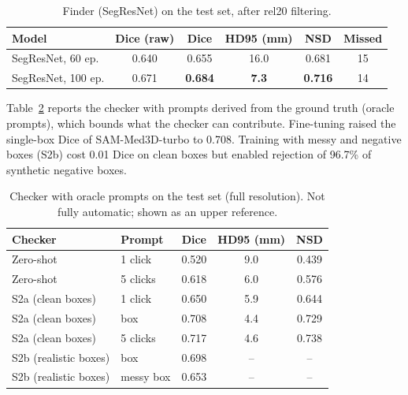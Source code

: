 \documentclass[journal]{IEEEtran}
\begin{document}
\begin{table}[t]
\centering
\caption{Finder (SegResNet) on the test set, after rel20 filtering.}
\label{tab:finder}
\setlength{\tabcolsep}{4pt}
\begin{tabular}{lccccc}
\toprule
Model & Dice (raw) & Dice & HD95 (mm) & NSD & Missed \\
\midrule
SegResNet, 60 ep. & 0.640 & 0.655 & 16.0 & 0.681 & 15 \\
SegResNet, 100 ep. & 0.671 & \textbf{0.684} & \textbf{7.3} & \textbf{0.716} & 14 \\
\bottomrule
\end{tabular}
\end{table}

Table~\ref{tab:checker} reports the checker with prompts derived from the ground truth (oracle prompts), which bounds what the checker can contribute. Fine-tuning raised the single-box Dice of SAM-Med3D-turbo to 0.708. Training with messy and negative boxes (S2b) cost 0.01 Dice on clean boxes but enabled rejection of 96.7\% of synthetic negative boxes.

\begin{table}[t]
\centering
\caption{Checker with oracle prompts on the test set (full resolution). Not fully automatic; shown as an upper reference.}
\label{tab:checker}
\setlength{\tabcolsep}{4pt}
\begin{tabular}{llccc}
\toprule
Checker & Prompt & Dice & HD95 (mm) & NSD \\
\midrule
Zero-shot & 1 click & 0.520 & 9.0 & 0.439 \\
Zero-shot & 5 clicks & 0.618 & 6.0 & 0.576 \\
S2a (clean boxes) & 1 click & 0.650 & 5.9 & 0.644 \\
S2a (clean boxes) & box & 0.708 & 4.4 & 0.729 \\
S2a (clean boxes) & 5 clicks & 0.717 & 4.6 & 0.738 \\
S2b (realistic boxes) & box & 0.698 & -- & -- \\
S2b (realistic boxes) & messy box & 0.653 & -- & -- \\
\bottomrule
\end{tabular}
\end{table}
\end{document}
